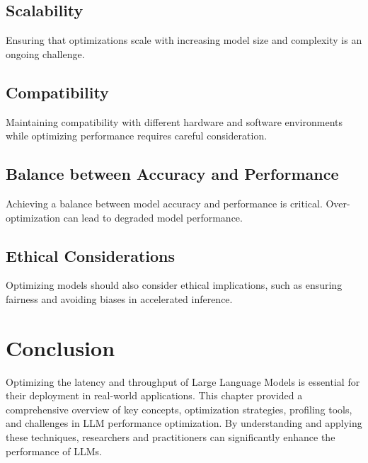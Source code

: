 \subsection{Scalability}
Ensuring that optimizations scale with increasing model size and complexity is an ongoing challenge.

\subsection{Compatibility}
Maintaining compatibility with different hardware and software environments while optimizing performance requires careful consideration.

\subsection{Balance between Accuracy and Performance}
Achieving a balance between model accuracy and performance is critical. Over-optimization can lead to degraded model performance.

\subsection{Ethical Considerations}
Optimizing models should also consider ethical implications, such as ensuring fairness and avoiding biases in accelerated inference.

\section{Conclusion}
Optimizing the latency and throughput of Large Language Models is essential for their deployment in real-world applications. This chapter provided a comprehensive overview of key concepts, optimization strategies, profiling tools, and challenges in LLM performance optimization. By understanding and applying these techniques, researchers and practitioners can significantly enhance the performance of LLMs.


% 
% 

